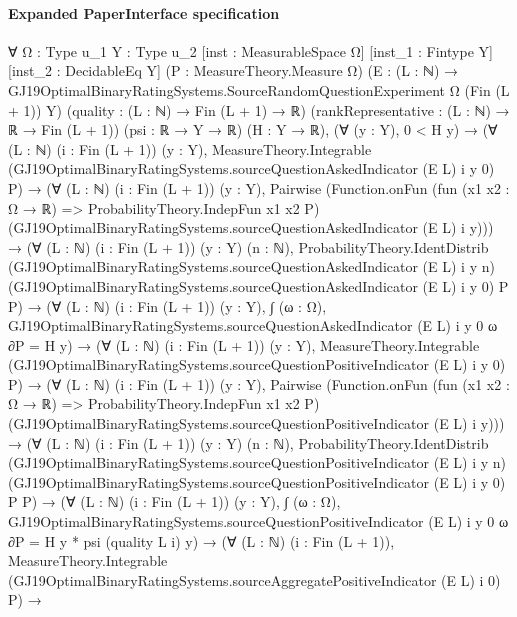 \documentclass[10pt]{article}
\begin{document}
\paragraph{Expanded PaperInterface specification}
\begin{ReviewVerbatim}
∀ {Ω : Type u_1} {Y : Type u_2} [inst : MeasurableSpace Ω] [inst_1 : Fintype Y] [inst_2 : DecidableEq Y]
  (P : MeasureTheory.Measure Ω)
  (E : (L : ℕ) → GJ19OptimalBinaryRatingSystems.SourceRandomQuestionExperiment Ω (Fin (L + 1)) Y)
  (quality : (L : ℕ) → Fin (L + 1) → ℝ) (rankRepresentative : (L : ℕ) → ℝ → Fin (L + 1)) (psi : ℝ → Y → ℝ) (H : Y → ℝ),
  (∀ (y : Y), 0 < H y) →
    (∀ (L : ℕ) (i : Fin (L + 1)) (y : Y),
        MeasureTheory.Integrable (GJ19OptimalBinaryRatingSystems.sourceQuestionAskedIndicator (E L) i y 0) P) →
      (∀ (L : ℕ) (i : Fin (L + 1)) (y : Y),
          Pairwise
            (Function.onFun (fun (x1 x2 : Ω → ℝ) => ProbabilityTheory.IndepFun x1 x2 P)
              (GJ19OptimalBinaryRatingSystems.sourceQuestionAskedIndicator (E L) i y))) →
        (∀ (L : ℕ) (i : Fin (L + 1)) (y : Y) (n : ℕ),
            ProbabilityTheory.IdentDistrib (GJ19OptimalBinaryRatingSystems.sourceQuestionAskedIndicator (E L) i y n)
              (GJ19OptimalBinaryRatingSystems.sourceQuestionAskedIndicator (E L) i y 0) P P) →
          (∀ (L : ℕ) (i : Fin (L + 1)) (y : Y),
              ∫ (ω : Ω), GJ19OptimalBinaryRatingSystems.sourceQuestionAskedIndicator (E L) i y 0 ω ∂P = H y) →
            (∀ (L : ℕ) (i : Fin (L + 1)) (y : Y),
                MeasureTheory.Integrable (GJ19OptimalBinaryRatingSystems.sourceQuestionPositiveIndicator (E L) i y 0)
                  P) →
              (∀ (L : ℕ) (i : Fin (L + 1)) (y : Y),
                  Pairwise
                    (Function.onFun (fun (x1 x2 : Ω → ℝ) => ProbabilityTheory.IndepFun x1 x2 P)
                      (GJ19OptimalBinaryRatingSystems.sourceQuestionPositiveIndicator (E L) i y))) →
                (∀ (L : ℕ) (i : Fin (L + 1)) (y : Y) (n : ℕ),
                    ProbabilityTheory.IdentDistrib
                      (GJ19OptimalBinaryRatingSystems.sourceQuestionPositiveIndicator (E L) i y n)
                      (GJ19OptimalBinaryRatingSystems.sourceQuestionPositiveIndicator (E L) i y 0) P P) →
                  (∀ (L : ℕ) (i : Fin (L + 1)) (y : Y),
                      ∫ (ω : Ω), GJ19OptimalBinaryRatingSystems.sourceQuestionPositiveIndicator (E L) i y 0 ω ∂P =
                        H y * psi (quality L i) y) →
                    (∀ (L : ℕ) (i : Fin (L + 1)),
                        MeasureTheory.Integrable
                          (GJ19OptimalBinaryRatingSystems.sourceAggregatePositiveIndicator (E L) i 0) P) →

\end{ReviewVerbatim}
\end{document}
